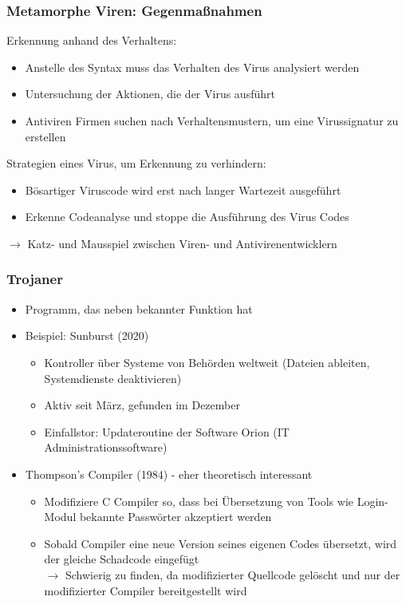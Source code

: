 \subsubsection*{Metamorphe Viren: Gegenmaßnahmen}
Erkennung anhand des Verhaltens:
\begin{itemize}
    \item Anstelle des Syntax muss das Verhalten des Virus analysiert werden
    \item Untersuchung der Aktionen, die der Virus ausführt
    \item Antiviren Firmen suchen nach Verhaltensmustern, um eine Virussignatur zu erstellen
\end{itemize}
Strategien eines Virus, um Erkennung zu verhindern:
\begin{itemize}
    \item Bösartiger Viruscode wird erst nach langer Wartezeit ausgeführt
    \item Erkenne Codeanalyse und stoppe die Ausführung des Virus Codes
\end{itemize}
$\rightarrow$ Katz- und Mausspiel zwischen Viren- und Antivirenentwicklern
\subsubsection*{Trojaner}
\begin{itemize}
    \item Programm, das neben bekannter Funktion  hat
    \item Beispiel: Sunburst (2020)
    \begin{itemize}
        \item Kontroller über Systeme von Behörden weltweit (Dateien ableiten, Systemdienste deaktivieren)
        \item Aktiv seit März, gefunden im Dezember
        \item Einfallstor: Updateroutine der Software Orion (IT Administrationssoftware)
    \end{itemize}
    \item Thompson's Compiler (1984) - eher theoretisch interessant
    \begin{itemize}
        \item Modifiziere C Compiler so, dass bei Übersetzung von Tools wie Login-Modul bekannte Passwörter akzeptiert werden
        \item Sobald Compiler eine neue Version seines eigenen Codes übersetzt, wird der gleiche Schadcode eingefügt\\
        $\rightarrow$ Schwierig zu finden, da modifizierter Quellcode gelöscht und nur der modifizierter Compiler bereitgestellt wird
    \end{itemize}
\end{itemize}
